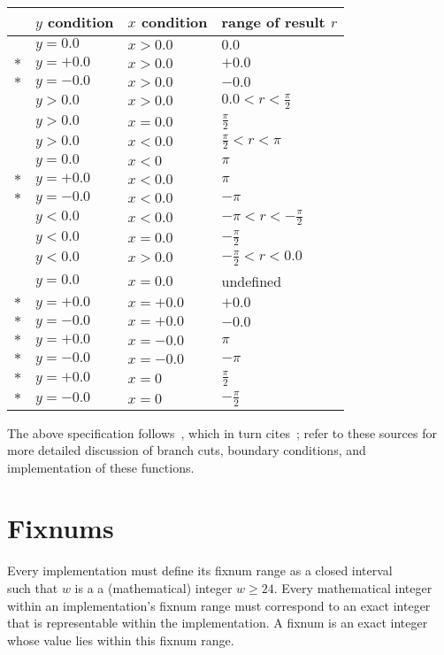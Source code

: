 \begin{center}
\begin{tabular}{clll}
& $y$ condition & $x$ condition & range of result $r$\\\hline
& $y = 0.0$ & $x > 0.0$ & $0.0$\\
$\ast$ & $y = +0.0$  & $x > 0.0$ & $+0.0$\\     
$\ast$ & $y = -0.0$ & $x > 0.0$ & $-0.0$\\
& $y > 0.0$ & $x > 0.0$ & $0.0 < r < \frac{\pi}{2}$\\
& $y > 0.0$ & $x = 0.0$ & $\frac{\pi}{2}$\\
& $y > 0.0$ & $x < 0.0$ & $\frac{\pi}{2} < r < \pi$\\
& $y = 0.0$ & $x < 0$ & $\pi$\\
$\ast$ & $y = +0.0$ & $x < 0.0$ & $\pi$\\
$\ast$ & $y = -0.0$ & $x < 0.0$ & $-\pi$\\      
&$y < 0.0$ & $x < 0.0$ & $-\pi< r< -\frac{\pi}{2}$\\
&$y < 0.0$ & $x = 0.0$ & $-\frac{\pi}{2}$\\
&$y < 0.0$ & $x > 0.0$ & $-\frac{\pi}{2} < r< 0.0$\\    
&$y = 0.0$ & $x = 0.0$ & undefined\\
$\ast$& $y = +0.0$ & $x = +0.0$ & $+0.0$\\
$\ast$& $y = -0.0$ & $x = +0.0$& $-0.0$\\
$\ast$& $y = +0.0$ & $x = -0.0$ & $\pi$\\
$\ast$& $y = -0.0$ & $x = -0.0$ & $-\pi$\\
$\ast$& $y = +0.0$ & $x = 0$ & $\frac{\pi}{2}$\\
$\ast$& $y = -0.0$ & $x = 0$    & $-\frac{\pi}{2}$
\end{tabular}
\end{center}

The above specification follows~\cite{CLtL}, which in turn
cites~\cite{Penfield81}; refer to these sources for more detailed
discussion of branch cuts, boundary conditions, and implementation of
these functions.

\section{Fixnums}
\label{fixnumssection}

Every implementation must define its fixnum range as a closed
interval
%
\begin{displaymath}
[-2^{w-1}, 2^{w-1} - 1]
\end{displaymath}
%
such that $w$ is a a (mathematical) integer $w \geq 24$.  Every
mathematical integer within an implementation's fixnum range must
correspond to an exact integer that is representable within the
implementation.
A fixnum is an exact integer whose value lies within this
fixnum range.

